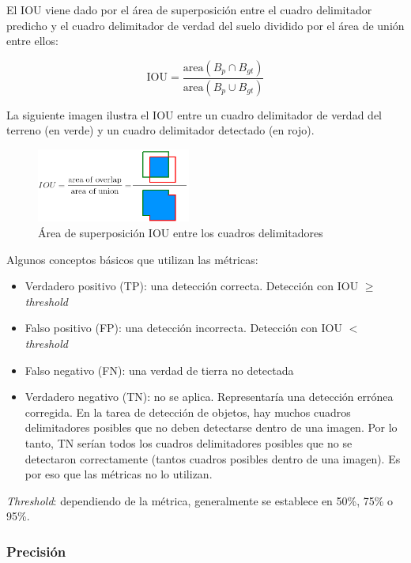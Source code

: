El IOU viene dado por el área de superposición entre el cuadro delimitador predicho y el cuadro delimitador de verdad del suelo dividido por el área de unión entre ellos:

\begin{equation}
\label{eq:iou}
\text{IOU}=\frac{\text{area}\left(B_{p} \cap B_{gt} \right)}{\text{area}\left(B_{p} \cup B_{gt} \right)}    
\end{equation}

La siguiente imagen ilustra el IOU entre un cuadro delimitador de verdad del terreno (en verde) y un cuadro delimitador detectado (en rojo).

\begin{figure}[ht]
\centering
\includegraphics[width=0.45\textwidth]{img/chapters/resultados/metricas/iou.png}
\caption{\label{fig:iou}Área de superposición IOU entre los cuadros delimitadores}
\end{figure}

Algunos conceptos básicos que utilizan las métricas:

\begin{itemize}
    \item Verdadero positivo (TP): una detección correcta. Detección con IOU $\ge$ \textit{threshold}
    \item Falso positivo (FP): una detección incorrecta. Detección con IOU $<$ \textit{threshold}
    \item Falso negativo (FN): una verdad de tierra no detectada
    \item Verdadero negativo (TN): no se aplica. Representaría una detección errónea corregida. En la tarea de detección de objetos, hay muchos cuadros delimitadores posibles que no deben detectarse dentro de una imagen. Por lo tanto, TN serían todos los cuadros delimitadores posibles que no se detectaron correctamente (tantos cuadros posibles dentro de una imagen). Es por eso que las métricas no lo utilizan.
\end{itemize}

\textit{Threshold}: dependiendo de la métrica, generalmente se establece en 50\%, 75\% o 95\%.

\subsubsection{Precisión}
\label{subsubsec:precision}


